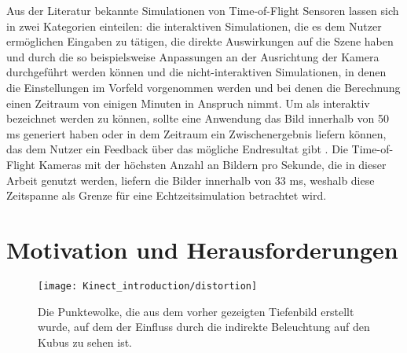 \documentclass[thesis.tex]{subfiles}
\begin{document}
Aus der Literatur bekannte Simulationen von Time-of-Flight Sensoren lassen sich in zwei Kategorien einteilen: die interaktiven Simulationen, die es dem Nutzer ermöglichen Eingaben zu tätigen, die direkte Auswirkungen auf die Szene haben und durch die so beispielsweise Anpassungen an der Ausrichtung der Kamera durchgeführt werden können und die nicht-interaktiven Simulationen, in denen die Einstellungen im Vorfeld vorgenommen werden und bei denen die Berechnung einen Zeitraum von einigen Minuten in Anspruch nimmt. Um als interaktiv bezeichnet werden zu können, sollte eine Anwendung das Bild innerhalb von 50 ms generiert haben oder in dem Zeitraum ein Zwischenergebnis liefern können, das dem Nutzer ein Feedback über das mögliche Endresultat gibt \cite{bib:Claypool-Damaa2006}. Die Time-of-Flight Kameras mit der höchsten Anzahl an Bildern pro Sekunde, die in dieser Arbeit genutzt werden, liefern die Bilder innerhalb von 33 ms, weshalb diese Zeitspanne als Grenze für eine Echtzeitsimulation betrachtet wird.

\section{Motivation und Herausforderungen}

\begin{figure}[h!]
\centering
\texttt{[image: Kinect\_introduction/distortion]}
\caption{Die Punktewolke, die aus dem vorher gezeigten Tiefenbild erstellt wurde, auf dem der Einfluss durch die indirekte Beleuchtung auf den Kubus zu sehen ist.}
\label{fig:motivation_picture}
\end{figure}
\end{document}
